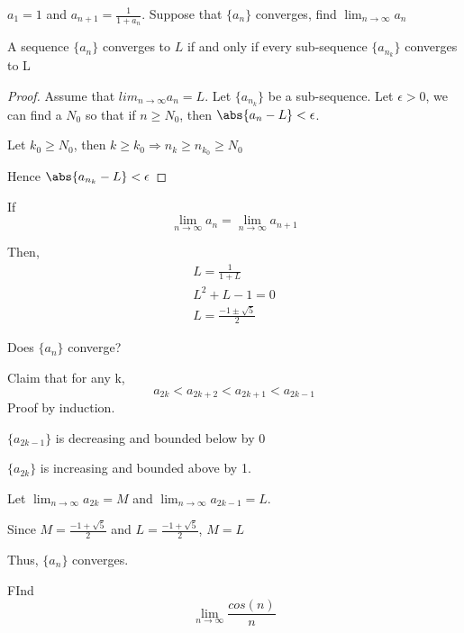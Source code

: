 \begin{exmp}
$a_1 = 1$ and $\displaystyle a_{n+1} = \frac{1}{1+a_n}$. Suppose that $\{a_n\}$ converges, find $\lim_{n\to \infty} a_n$
\end{exmp}

\begin{prop}
A sequence $\{a_n\}$ converges to $L$ if and only if every sub-sequence $\{a_{n_k}\}$ converges to L
\end{prop}
\begin{proof}
Assume that $lim_{n\to \infty} a_n = L$. Let $\{a_{n_k}\}$ be a sub-sequence. Let $\epsilon > 0$, we can find a $N_0$ so that if $n\geq N_0$, then $\abs{a_n - L}<\epsilon$.

Let $k_0 \geq N_0$, then $k\geq k_0 \Rightarrow n_k \geq n_{k_0}\geq N_0$

Hence $\abs{a_{n_k} - L}<\epsilon$
\end{proof}

\begin{solution}
If \[\lim_{n\to\infty} a_n = \lim_{n\to \infty} a_{n+1}\]

Then,
\begin{gather*}
    L = \frac{1}{1+L} \\
    L^2+L-1 = 0\\
    L = \frac{-1 \pm \sqrt{5}}{2}
\end{gather*}
\end{solution}

\begin{ques}
Does $\{a_n\}$ converge?
\end{ques}
\begin{solution}
Claim that for any k,
\[a_{2k}<a_{2k+2}<a_{2k+1}<a_{2k-1}\]
Proof by induction.

$\{a_{2k-1}\}$ is decreasing and bounded below by 0

$\{a_{2k}\}$ is increasing and bounded above by 1.

Let $\lim_{n\to\infty} a_{2k} = M$ and $\lim_{n\to\infty} a_{2k-1} = L$.

Since $M = \displaystyle \frac{-1 + \sqrt{5}}{2}$ and $L = \displaystyle \frac{-1 + \sqrt{5}}{2}$, $M = L$

Thus, $\{a_n\}$ converges.
\end{solution}
\begin{exmp}
FInd $$\lim_{n\to\infty} \frac{cos(n)}{n}$$
\end{exmp}



